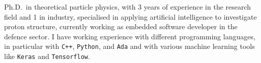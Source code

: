 

\begin{cvparagraph}

Ph.D.\ in theoretical particle physics, with 3 years of experience in the research field and 1 in industry,
specialised in applying artificial intelligence to investigate
proton structure, currently working as embedded software developer in the defence sector.
I have working experience with different programming languages, in particular with \texttt{C++}, \texttt{Python}, and \texttt{Ada}
and with various machine learning tools like \texttt{Keras} and \texttt{Tensorflow}.
\end{cvparagraph}